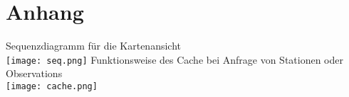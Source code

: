 \section{Anhang}
Sequenzdiagramm für die Kartenansicht \\
\texttt{[image: seq.png]}
\newpage
Funktionsweise des Cache bei Anfrage von Stationen oder Observations \\
\texttt{[image: cache.png]}